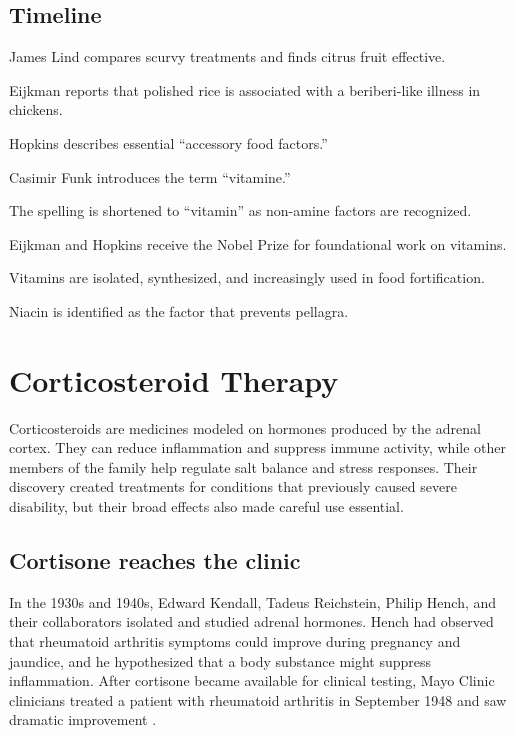 \documentclass[12pt,oneside]{book}
\begin{document}
\section*{Timeline}
\begin{description}[leftmargin=2.3cm,style=nextline]
  \item[1747] James Lind compares scurvy treatments and finds citrus fruit effective.
  \item[1897] Eijkman reports that polished rice is associated with a beriberi-like illness in chickens.
  \item[1906] Hopkins describes essential ``accessory food factors.''
  \item[1912] Casimir Funk introduces the term ``vitamine.''
  \item[1920] The spelling is shortened to ``vitamin'' as non-amine factors are recognized.
  \item[1929] Eijkman and Hopkins receive the Nobel Prize for foundational work on vitamins.
  \item[1930s--1940s] Vitamins are isolated, synthesized, and increasingly used in food fortification.
  \item[1937] Niacin is identified as the factor that prevents pellagra.
\end{description}
\chapter[Corticosteroid Therapy]{Corticosteroid Therapy}

Corticosteroids are medicines modeled on hormones produced by the adrenal
cortex. They can reduce inflammation and suppress immune activity, while other
members of the family help regulate salt balance and stress responses. Their
discovery created treatments for conditions that previously caused severe
disability, but their broad effects also made careful use essential.

\section{Cortisone reaches the clinic}
In the 1930s and 1940s, Edward Kendall, Tadeus Reichstein, Philip Hench, and their collaborators isolated and studied adrenal hormones. Hench had observed that rheumatoid arthritis symptoms could improve during pregnancy and jaundice, and he hypothesized that a body substance might suppress inflammation. After cortisone became available for clinical testing, Mayo Clinic clinicians treated a patient with rheumatoid arthritis in September 1948 and saw dramatic improvement \cite{mayoCortisoneHistory}.
\end{document}
